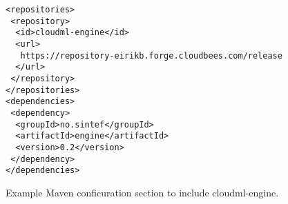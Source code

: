 \begin{figure}[tb]
  \begin{center}
    \begin{verbatim}
<repositories>
 <repository>
  <id>cloudml-engine</id>
  <url>
   https://repository-eirikb.forge.cloudbees.com/release
  </url>
 </repository>
</repositories>
<dependencies>
 <dependency>
  <groupId>no.sintef</groupId>
  <artifactId>engine</artifactId>
  <version>0.2</version>
 </dependency>
</dependencies>
    \end{verbatim}
  \end{center}
  \caption{Example Maven conficuration section to include cloudml-engine.}
  \label{list:pom-example}
\end{figure}

